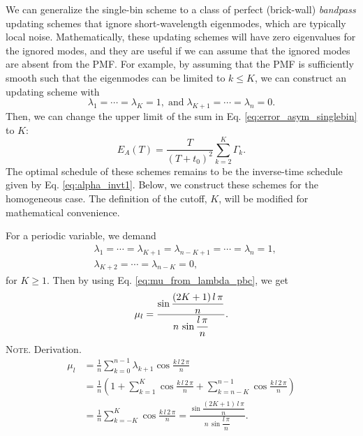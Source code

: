 \documentclass[reprint, superscriptaddress, floatfix]{revtex4-1}
\newcommand{\note}[1]{{\color{DarkGreen}\footnotesize \textsc{Note.} #1}}
\newcommand{\Err}{E}
\begin{document}
We can generalize
the single-bin scheme to a class of
perfect (brick-wall) \emph{bandpass} updating schemes
that ignore short-wavelength eigenmodes,
which are typically local noise.
%
Mathematically, these updating schemes will have
zero eigenvalues for the ignored modes,
and they are useful if we can assume that
the ignored modes are absent from the PMF.
%
For example,
by assuming
that the PMF is sufficiently smooth
such that the eigenmodes can be limited to $k \le K$,
%
we can construct an updating scheme with
$$
\lambda_1 = \cdots = \lambda_K = 1,
\mathrm{\; and \;}
\lambda_{K+1} = \cdots = \lambda_n = 0.
$$
%
Then,
we can change the upper limit of the sum in
Eq. \eqref{eq:error_asym_singlebin} to $K$:
%
%
\begin{equation}
  \Err_A(T)
  =
  \frac {       T     }
        { (T + t_0)^2 }
  \sum_{ k = 2 }^K
    \Gamma_k.
\label{eq:error_asym_sinc}
\end{equation}
%
The optimal schedule of these schemes
remains to be the inverse-time schedule
given by Eq. \eqref{eq:alpha_invt1}.
%
Below, we construct these schemes for
the homogeneous case.
%
The definition of the cutoff, $K$, will be modified
for mathematical convenience.

For a periodic variable, we demand
%
$$
\begin{aligned}
&
\lambda_1 = \cdots = \lambda_{K+1}
= \lambda_{n-K+1} = \cdots = \lambda_n = 1,
\\
&
\lambda_{K+2} = \cdots = \lambda_{n-K} = 0,
\end{aligned}
$$
for $K \ge 1$.
%
Then by using
Eq. \eqref{eq:mu_from_lambda_pbc},
we get
\begin{equation}
  \mu_l
  =
  \frac{
    \sin
    \dfrac{ (2 K + 1) \, l \, \pi }
         {              n        }
  }
  {
    n \, \sin \dfrac{ l \, \pi } { n }
  }
  .
\notag
\end{equation}
\note{Derivation.
$$
\begin{aligned}
\mu_l
&=
\frac 1 n \sum_{k = 0}^{n-1} \lambda_{k+1} \cos \frac{ k \, l \, 2 \, \pi } { n }
\\
&=
\frac{1}{n}
\left(
  1 +
  \sum_{k=1}^K
  \cos \frac { k \, l \, 2 \, \pi } { n }
  +
  \sum_{k=n-K}^{n-1}
  \cos \frac { k \, l \, 2 \, \pi } { n }
\right)
\\
&=
\frac 1 n
\sum_{k=-K}^K
\cos \frac { k \, l \, 2 \, \pi } { n }
=
  \frac{
    \sin
    \dfrac{ (2 K + 1) \, l \, \pi }
         {              n        }
  }
  {
    n \, \sin \dfrac{ l \, \pi } { n }
  }
.
\end{aligned}
$$
}
\end{document}
